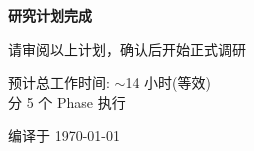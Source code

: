 \documentclass[UTF8,11pt,aspectratio=169]{beamer}
\begin{document}
\begin{frame}[plain]
    \centering
    \vspace{1.5cm}
    {\Huge \textbf{研究计划完成}}

    \vspace{1cm}
    {\Large 请审阅以上计划，确认后开始正式调研}

    \vspace{1cm}
    {\normalsize 预计总工作时间: $\sim$14 小时(等效)} \\
    {\normalsize 分 5 个 Phase 执行}

    \vspace{1cm}
    {\small 编译于 \today}
\end{frame}
\end{document}
